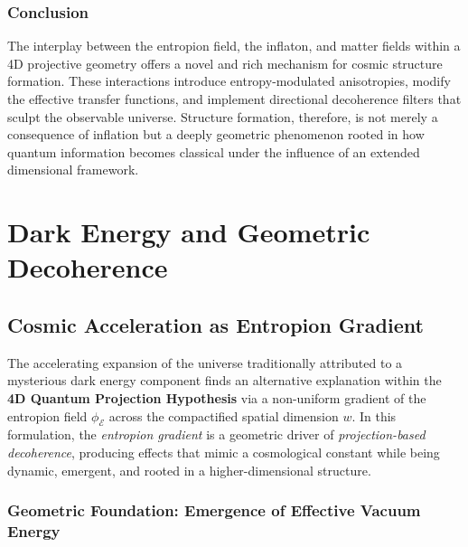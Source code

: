 \documentclass[12pt]{article}
\begin{document}
\subsubsection*{Conclusion}

The interplay between the entropion field, the inflaton, and matter fields within a 4D projective geometry offers a novel and rich mechanism for cosmic structure formation. These interactions introduce entropy-modulated anisotropies, modify the effective transfer functions, and implement directional decoherence filters that sculpt the observable universe. Structure formation, therefore, is not merely a consequence of inflation but a deeply geometric phenomenon rooted in how quantum information becomes classical under the influence of an extended dimensional framework.


\section{Dark Energy and Geometric Decoherence}

\subsection{Cosmic Acceleration as Entropion Gradient}
\label{subsec:cosmic_acceleration_entropion}

The accelerating expansion of the universe traditionally attributed to a mysterious dark energy component finds an alternative explanation within the \textbf{4D Quantum Projection Hypothesis} via a non-uniform gradient of the entropion field \(\phi_{\mathcal{E}}\) across the compactified spatial dimension \(w\). In this formulation, the \emph{entropion gradient} is a geometric driver of \emph{projection-based decoherence}, producing effects that mimic a cosmological constant while being dynamic, emergent, and rooted in a higher-dimensional structure.

\subsubsection*{Geometric Foundation: Emergence of Effective Vacuum Energy}
\end{document}
